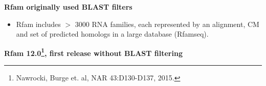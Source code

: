 \documentclass[landscape]{slides}
\begin{document}
\begin{slide}
\begin{slide}
\vfill
\end{slide}
\begin{slide}
\begin{center}

\textbf{Rfam originally used BLAST filters}

\end{center}

\begin{itemize}
\item Rfam includes $>$ 3000 RNA families, each represented by an
  alignment, CM and set of predicted homologs in a large database (Rfamseq).
\end{itemize}


\vfill
\end{slide}
\begin{slide}
\begin{center}

\textbf{Rfam 12.0\footnote{Nawrocki, Burge et. al, NAR 43:D130-D137, 2015.}, 
first release without BLAST filtering}
\end{center}



\end{slide}
\end{slide}
\end{document}
